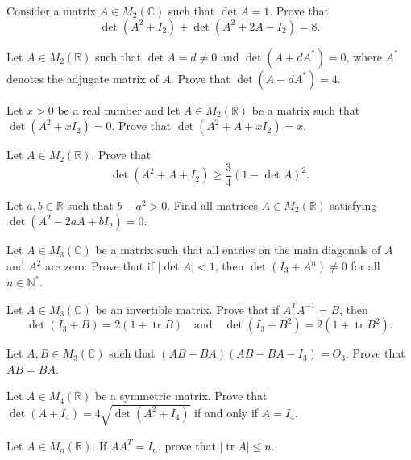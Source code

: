 \documentclass[12pt]{article}
\begin{document}
\begin{problem}
Consider a matrix $A\in M_2(\mathbb{C})$ such that $\det A=1$. Prove that
\[
\det(A^2+I_2) + \det(A^2+2A-I_2) = 8.
\]
\end{problem}

\begin{problem}
Let $A\in M_2(\mathbb{R})$ such that $\det A = d\ne 0$ and $\det(A+dA^*)=0$, where $A^*$ denotes the adjugate matrix of $A$. Prove that $\det(A-dA^*)=4$.
\end{problem}

\begin{problem}
Let $x>0$ be a real number and let $A\in M_2(\mathbb{R})$ be a matrix such that $\det(A^2+xI_2)=0$. Prove that $\det(A^2+A+xI_2)=x$.
\end{problem}

\begin{problem}
Let $A\in M_2(\mathbb{R})$. Prove that
\[
\det(A^2+A+I_2) \ge \frac{3}{4}(1-\det A)^2.
\]
\end{problem}

\begin{problem}
Let $a,b\in\mathbb{R}$ such that $b-a^2>0$. Find all matrices $A\in M_2(\mathbb{R})$ satisfying $\det(A^2-2aA+bI_2)=0$.
\end{problem}

\begin{problem}
Let $A\in M_3(\mathbb{C})$ be a matrix such that all entries on the main diagonals of $A$ and $A^2$ are zero. Prove that if $|\det A|<1$, then $\det(I_3+A^n)\ne 0$ for all $n\in\mathbb{N}^*$.
\end{problem}

\begin{problem}
Let $A\in M_3(\mathbb{C})$ be an invertible matrix. Prove that if $A^TA^{-1}=B$, then
\[
\det(I_3+B) = 2(1+\operatorname{tr}B) \quad\text{and}\quad \det(I_3+B^2) = 2(1+\operatorname{tr}B^2).
\]
\end{problem}

\begin{problem}
Let $A,B\in M_3(\mathbb{C})$ such that $(AB-BA)(AB-BA-I_3)=O_3$. Prove that $AB=BA$.
\end{problem}

\begin{problem}
Let $A\in M_4(\mathbb{R})$ be a symmetric matrix. Prove that $\det(A+I_4) = 4\sqrt{\det(A^2+I_4)}$ if and only if $A=I_4$.
\end{problem}

\begin{problem}
Let $A\in M_n(\mathbb{R})$. If $AA^T=I_n$, prove that $|\operatorname{tr}A|\le n$.
\end{problem}
\end{document}
